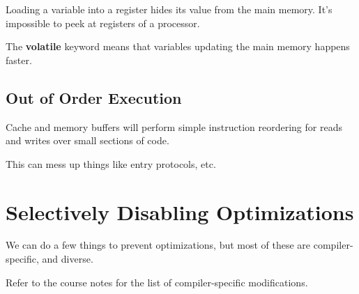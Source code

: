                 Loading a variable into a register hides its value from the main memory.
                It's impossible to peek at registers of a processor.

                The \textbf{volatile} keyword means that variables updating the main memory happens faster.
            \subsection{Out of Order Execution} %
            \label{sub:out_of_order_execution}
                Cache and memory buffers will perform simple instruction reordering for reads and writes over small sections of code.

                This can mess up things like entry protocols, etc.
        \section{Selectively Disabling Optimizations} %
        \label{sec:selectively_disabling_optimizations}
            We can do a few things to prevent optimizations, but most of these are compiler-specific, and diverse.

            Refer to the course notes for the list of compiler-specific modifications.


